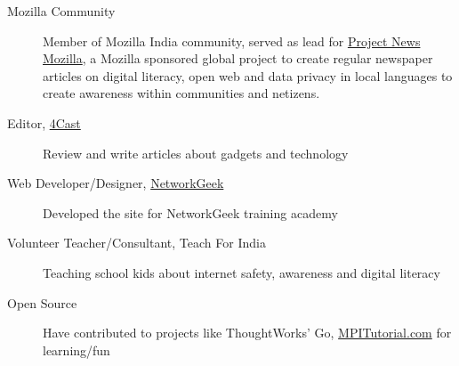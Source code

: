 \documentclass[letterpaper,11pt]{article}
\begin{document}
	\begin{description}
		\item[Mozilla Community] {\footnotesize Member of Mozilla India community, served as lead for \href{https://wiki.mozilla.org/NeMo}{Project News Mozilla}, a Mozilla sponsored global project to create regular newspaper articles on digital literacy, open web and data privacy in local languages to create awareness within communities and netizens. }
		\item[Editor, \href{http://www.the4cast.com/author/dwarak}{4Cast}] {\footnotesize Review and write articles about gadgets and technology}
		\item[Web Developer/Designer, \href{http://networkgeek.in/}{NetworkGeek}] {\footnotesize Developed the site for NetworkGeek training academy}
		\item[Volunteer Teacher/Consultant, Teach For India]{\footnotesize Teaching school kids about internet safety, awareness and digital literacy}
		\item[Open Source] {\footnotesize{ Have contributed to projects like ThoughtWorks' Go, \href{https://mpitutorial.com/about/}{MPITutorial.com} for learning/fun}}
	\end{description}
\end{document}
